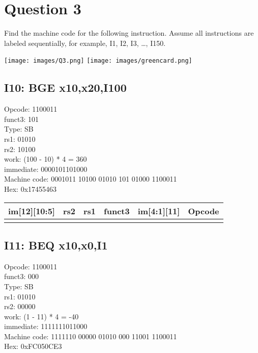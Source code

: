 \documentclass{article}
\begin{document}
\section*{Question 3}
Find the machine code for the following instruction. Assume all instructions are labeled
sequentially, for example, I1, I2, I3, …, I150. 

\begin{center}
    \texttt{[image: images/Q3.png]}
    \texttt{[image: images/greencard.png]}
\end{center}

\subsection*{I10:   BGE x10,x20,I100}

Opcode: 1100011\\
funct3: 101\\
Type: SB\\
rs1: 01010\\
rs2: 10100\\
work: (100 - 10) * 4 = 360\\
immediate: 0000101101000\\
Machine code: 0001011 10100 01010 101 01000 1100011\\
Hex: 0x17455463\\

\begin{center}
	\begin{tabularx}{1.15\textwidth} { 
		| >{\centering\arraybackslash}X 
		| >{\centering\arraybackslash}X 
		| >{\centering\arraybackslash}X 
		| >{\centering\arraybackslash}X
        | >{\centering\arraybackslash}X
		| >{\centering\arraybackslash}X | }
	   \hline
	   	im[12][10:5] & rs2 & rs1 & funct3 & im[4:1][11] & Opcode \\
	   \hline
	   0001011  & 10100  & 01010 & 101 & 01000 & 1100011 \\
	  \hline
	\end{tabularx}
\end{center}

\subsection*{I11:   BEQ x10,x0,I1}

Opcode: 1100011\\
funct3: 000\\
Type: SB\\
rs1: 01010\\
rs2: 00000\\
work: (1 - 11) * 4 = -40\\
immediate: 1111111011000\\
Machine code: 1111110 00000 01010 000 11001 1100011\\
Hex: 0xFC050CE3\\
\end{document}
